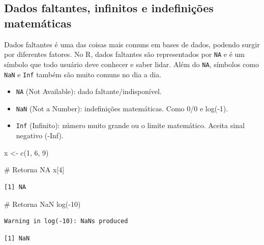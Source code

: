\documentclass[
  letterpaper,
  DIV=11,
  numbers=noendperiod]{scrreprt}
\newenvironment{Shaded}{\begin{snugshade}}{\end{snugshade}}
\newcommand{\CommentTok}[1]{\textcolor[rgb]{0.37,0.37,0.37}{#1}}
\newcommand{\DecValTok}[1]{\textcolor[rgb]{0.68,0.00,0.00}{#1}}
\newcommand{\FunctionTok}[1]{\textcolor[rgb]{0.28,0.35,0.67}{#1}}
\newcommand{\NormalTok}[1]{\textcolor[rgb]{0.00,0.23,0.31}{#1}}
\newcommand{\OtherTok}[1]{\textcolor[rgb]{0.00,0.23,0.31}{#1}}
\newcommand{\SpecialCharTok}[1]{\textcolor[rgb]{0.37,0.37,0.37}{#1}}
\providecommand{\tightlist}{%
  \setlength{\itemsep}{0pt}\setlength{\parskip}{0pt}}\usepackage{longtable,booktabs,array}
\begin{document}
\hypertarget{dados-faltantes-infinitos-e-indefiniuxe7uxf5es-matemuxe1ticas}{%
\subsection{Dados faltantes, infinitos e indefinições
matemáticas}\label{dados-faltantes-infinitos-e-indefiniuxe7uxf5es-matemuxe1ticas}}

Dados faltantes é uma das coisas mais comuns em bases de dados, podendo
surgir por diferentes fatores. No R, dados faltantes são representados
por \texttt{NA} e é um símbolo que todo usuário deve conhecer e saber
lidar. Além do \texttt{NA}, símbolos como \texttt{NaN} e \texttt{Inf}
também são muito comuns no dia a dia.

\begin{itemize}
\tightlist
\item
  \texttt{NA} (Not Available): dado faltante/indisponível.
\item
  \texttt{NaN} (Not a Number): indefinições matemáticas. Como 0/0 e
  log(-1).
\item
  \texttt{Inf} (Infinito): número muito grande ou o limite matemático.
  Aceita sinal negativo (-Inf).
\end{itemize}

\begin{Shaded}
\begin{Highlighting}[]
\NormalTok{x }\OtherTok{\textless{}{-}} \FunctionTok{c}\NormalTok{(}\DecValTok{1}\NormalTok{, }\DecValTok{6}\NormalTok{, }\DecValTok{9}\NormalTok{)}

\CommentTok{\# Retorna NA}
\NormalTok{x[}\DecValTok{4}\NormalTok{]}
\end{Highlighting}
\end{Shaded}

\begin{verbatim}
[1] NA
\end{verbatim}

\begin{Shaded}
\begin{Highlighting}[]
\CommentTok{\# Retorna NaN}
\FunctionTok{log}\NormalTok{(}\SpecialCharTok{{-}}\DecValTok{10}\NormalTok{)}
\end{Highlighting}
\end{Shaded}

\begin{verbatim}
Warning in log(-10): NaNs produced
\end{verbatim}

\begin{verbatim}
[1] NaN
\end{verbatim}
\end{document}
